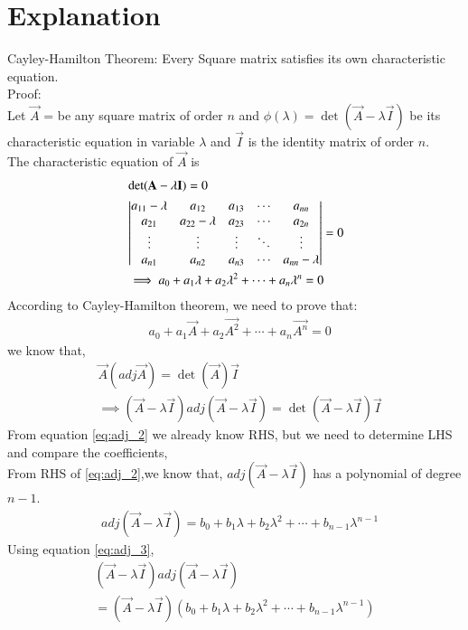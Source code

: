 \documentclass[journal,12pt,twocolumn]{IEEEtran}
\begin{document}
\section{Explanation}
Cayley-Hamilton Theorem: Every Square matrix satisfies its own characteristic equation.\\
Proof:\\
Let $\vec{A}$ =  be any square matrix of order $n$ and $\phi(\lambda) = \det({\vec{A}-\lambda \vec{I}})$ be its characteristic equation in variable $\lambda$ and $\vec{I}$ is the identity matrix of order $n$.\\
The characteristic equation of $\vec{A}$ is 
\begin{align}  
&\det({\mathbf{A}-\lambda \mathbf{I}}) = 0 \label{eq:eq_1}\\
& \begin{vmatrix}a_{11}-\lambda & a_{12} & a_{13} & \cdots & a_{nn} \\ 
a_{21} & a_{22}-\lambda & a_{23}& \cdots & a_{2n} \\
\vdots & \vdots & \vdots & \ddots &\vdots \\
a_{n1} & a_{n2} & a_{n3} & \cdots & a_{nn}-\lambda \\ \end{vmatrix} = 0\\
& \implies a_0 + a_1\lambda + a_2\lambda^{2} +  \cdots+a_n\lambda^{n} = 0\label{eq:char_eq}
\end{align}
According to Cayley-Hamilton theorem, we need to prove that:
\begin{align} 
&a_0 + a_1\vec{A} + a_2\vec{A^{2}} +  \cdots+a_n\vec{A^{n}} = 0 \label{eq:to_prove}
\end{align}
we know that,
\begin{align} 
& \vec{A}(adj\vec{A}) = \det(\vec{A})\vec{I} \label{eq:adj_1} \\
&\implies (\vec{A}-\lambda\vec{I})adj(\vec{A}-\lambda\vec{I}) = \det(\vec{A}-\lambda\vec{I})\vec{I}\label{eq:adj_2}
\end{align}
From equation \eqref{eq:adj_2} we already know RHS, but we need to determine LHS and compare the coefficients,\\
From RHS of \eqref{eq:adj_2},we know that,
$adj(\vec{A}-\lambda\vec{I})$ has a polynomial of degree $n-1$.\\
\begin{align} 
& adj(\vec{A}-\lambda\vec{I}) = b_0 + b_1\lambda + b_2\lambda^{2} +  \cdots+b_{n-1}\lambda^{n-1}\label{eq:adj_3}
\end{align}
Using equation \eqref{eq:adj_3},
\begin{multline}
 (\vec{A}-\lambda\vec{I}) adj(\vec{A}-\lambda\vec{I}) \\= (\vec{A}-\lambda\vec{I})(b_0 + b_1\lambda + b_2\lambda^{2} +  \cdots+b_{n-1}\lambda^{n-1})\\
\end{multline}
\end{document}
